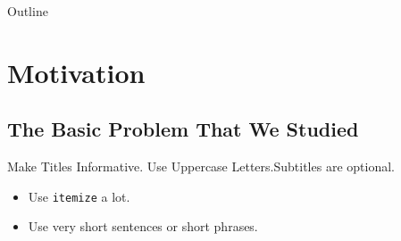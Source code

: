 \documentclass{beamer}
\title[Short Paper Title] %
{\titulo}
\subtitle{\subtitulo}
\author[] %
{\autor\inst{1} } %
\institute[] %
{
  \inst{1}%
  Department of Something\\
  University of Great Creations and Magic}
\date[] %
{DATE HERE}
\begin{document}
\begin{frame}
  \titlepage 
  \end{frame}

\begin{frame}{Outline}
  \tableofcontents
\end{frame}




% 

\section{Motivation} 
\subsection{The Basic Problem That We Studied}

\begin{frame}{Make Titles Informative. Use Uppercase Letters.}{Subtitles are optional.}

  \begin{itemize}
  \item
    Use \texttt{itemize} a lot.
  \item
    Use very short sentences or short phrases.
  \end{itemize}
\end{frame}
\end{document}
